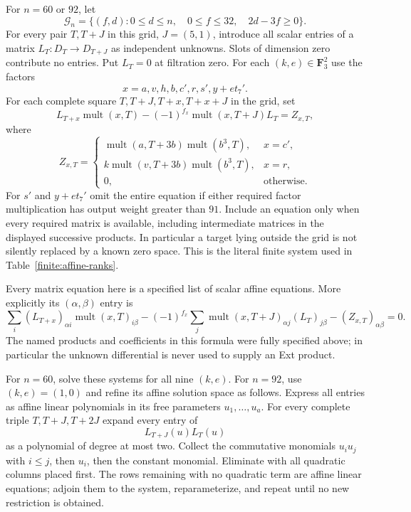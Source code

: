 \documentclass[11pt]{article}
\theoremstyle{definition}
\theoremstyle{remark}
\numberwithin{equation}{section}
\begin{document}
For $n=60$ or $92$, let
\begin{equation}\label{alg:finite-grid}
 \mathcal G_n=\{(f,d):0\leq d\leq n,\quad 0\leq f\leq32,
                                      \quad2d-3f\geq0\}.
\end{equation}
For every pair $T,T+J$ in this grid, $J=(5,1)$, introduce all scalar
entries of a matrix $L_T:D_T\to D_{T+J}$ as independent unknowns.
Slots of dimension zero contribute no entries.  Put $L_T=0$ at
filtration zero.  For each $(k,e)\in\mathbf F_3^2$ use the factors
\[
 x=a,v,h,b,c',r,s',y+e t_7'.
\]
For each complete square $T,T+J,T+x,T+x+J$ in the grid, set
\begin{equation}\label{alg:leibniz-equations}
 L_{T+x}\operatorname{mult}(x,T)
 -(-1)^{f_x}\operatorname{mult}(x,T+J)L_T=Z_{x,T},
\end{equation}
where
\begin{equation}\label{alg:leibniz-constants}
 Z_{x,T}=
 \begin{cases}
 \operatorname{mult}(a,T+3b)\operatorname{mult}(b^3,T),&x=c',\\
 k\operatorname{mult}(v,T+3b)\operatorname{mult}(b^3,T),&x=r,\\
 0,&\text{otherwise}.
 \end{cases}
\end{equation}
For $s'$ and $y+e t_7'$ omit the entire equation if either required
factor multiplication has output weight greater than $91$.
Include an equation only when every required matrix is available,
including intermediate matrices in the displayed successive products.
In particular a target lying outside the grid is not silently replaced
by a known zero space.  This is the literal finite system used in
Table~\ref{finite:affine-ranks}.

Every matrix equation here is a specified list of scalar affine
equations.  More explicitly its $(\alpha,\beta)$ entry is
\begin{equation}\label{alg:scalar-leibniz}
 \sum_i (L_{T+x})_{\alpha i}
              \operatorname{mult}(x,T)_{i\beta}
 -(-1)^{f_x}\sum_j
              \operatorname{mult}(x,T+J)_{\alpha j}
              (L_T)_{j\beta}-(Z_{x,T})_{\alpha\beta}=0.
\end{equation}
The named products and coefficients in this formula were fully
specified above; in particular the unknown differential is never used
to supply an Ext product.

For $n=60$, solve these systems for all nine $(k,e)$.  For $n=92$, use
$(k,e)=(1,0)$ and refine its affine solution space as follows.  Express
all entries as affine linear polynomials in its free parameters
$u_1,\ldots,u_a$.  For every complete triple $T,T+J,T+2J$ expand every
entry of
\begin{equation}\label{alg:square-polynomials}
 L_{T+J}(u)L_T(u)
\end{equation}
as a polynomial of degree at most two.  Collect the commutative
monomials $u_i u_j$ with $i\leq j$, then $u_i$, then the constant
monomial.  Eliminate with all quadratic columns placed first.  The
rows remaining with no quadratic term are affine linear equations;
adjoin them to the system, reparameterize, and repeat until no new
restriction is obtained.
\end{document}
